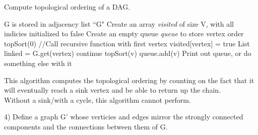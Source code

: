 \documentclass[12pt]{article}
\begin{document}
\begin{algorithm}[H]
\caption{Compute topological ordering of a DAG.}
\begin{algorithmic}
\Require G is stored in adjacency list ``G"
\State Create an array \textit{visited} of size V, with all indicies initialized to false
\State Create an empty queue \textit{queue} to store vertex order
\State
\State topSort(0) //Call recursive function with first vertex
\State
{}
\State visited[vertex] = true
\State List linked = G.get(vertex)
\State
{}
\State continue
\EndIf
\State
\State topSort(v)
\State
\State queue.add(v)
\EndFor
\EndFunction
\State
\State Print out queue, or do something else with it
\end{algorithmic}
\end{algorithm}
\noindent This algorithm computes the topological ordering by counting on the fact that it will eventually reach a sink vertex and be able to return up the chain.\\
Without a sink/with a cycle, this algorithm cannot perform.

\pagebreak

4) Define a graph G' whose verticies and edges mirror the strongly connected components and the connections between them of G.


\end{document}
